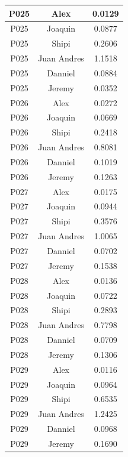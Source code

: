 \begin{longtable}{|c|c|c|}
    P025 & Alex        & 0.0129 \\ \hline
    P025 & Joaquin     & 0.0877 \\ \hline
    P025 & Shipi       & 0.2606 \\ \hline
    P025 & Juan Andres & 1.1518 \\ \hline
    P025 & Danniel     & 0.0884 \\ \hline
    P025 & Jeremy      & 0.0352 \\ \hline

    P026 & Alex        & 0.0272 \\ \hline
    P026 & Joaquin     & 0.0669 \\ \hline
    P026 & Shipi       & 0.2418 \\ \hline
    P026 & Juan Andres & 0.8081 \\ \hline
    P026 & Danniel     & 0.1019 \\ \hline
    P026 & Jeremy      & 0.1263 \\ \hline

    P027 & Alex        & 0.0175 \\ \hline
    P027 & Joaquin     & 0.0944 \\ \hline
    P027 & Shipi       & 0.3576 \\ \hline
    P027 & Juan Andres & 1.0065 \\ \hline
    P027 & Danniel     & 0.0702 \\ \hline
    P027 & Jeremy      & 0.1538 \\ \hline

    P028 & Alex        & 0.0136 \\ \hline
    P028 & Joaquin     & 0.0722 \\ \hline
    P028 & Shipi       & 0.2893 \\ \hline
    P028 & Juan Andres & 0.7798 \\ \hline
    P028 & Danniel     & 0.0709 \\ \hline
    P028 & Jeremy      & 0.1306 \\ \hline

    P029 & Alex        & 0.0116 \\ \hline
    P029 & Joaquin     & 0.0964 \\ \hline
    P029 & Shipi       & 0.6535 \\ \hline
    P029 & Juan Andres & 1.2425 \\ \hline
    P029 & Danniel     & 0.0968 \\ \hline
    P029 & Jeremy      & 0.1690 \\ \hline


\end{longtable}
